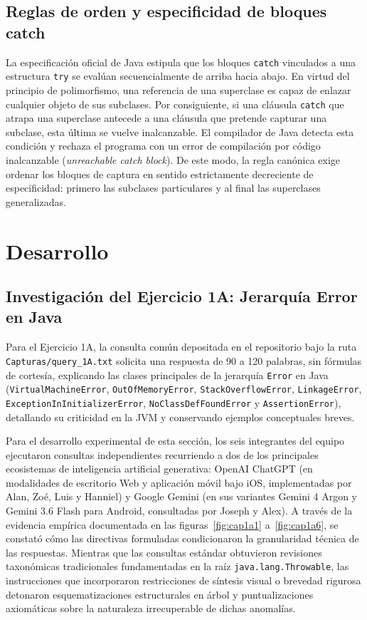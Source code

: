 \documentclass[letterpaper,12pt,oneside]{article}
\numberwithin{figure}{section}
\begin{document}
\subsection{Reglas de orden y especificidad de bloques catch}
La especificación oficial de Java \cite{gosling2023} estipula que los bloques \texttt{catch} vinculados a una estructura \texttt{try} se evalúan secuencialmente de arriba hacia abajo. En virtud del principio de polimorfismo, una referencia de una superclase es capaz de enlazar cualquier objeto de sus subclases. Por consiguiente, si una cláusula \texttt{catch} que atrapa una superclase antecede a una cláusula que pretende capturar una subclase, esta última se vuelve inalcanzable. El compilador de Java detecta esta condición y rechaza el programa con un error de compilación por código inalcanzable (\textit{unreachable catch block}). De este modo, la regla canónica exige ordenar los bloques de captura en sentido estrictamente decreciente de especificidad: primero las subclases particulares y al final las superclases generalizadas.

\section{Desarrollo}

\subsection{Investigación del Ejercicio 1A: Jerarquía Error en Java}
Para el Ejercicio 1A, la consulta común depositada en el repositorio bajo la ruta \texttt{Capturas/query\_1A.txt} solicita una respuesta de 90 a 120 palabras, sin fórmulas de cortesía, explicando las clases principales de la jerarquía \texttt{Error} en Java (\texttt{Virtual\-Machine\-Error}, \texttt{Out\-Of\-Memory\-Error}, \texttt{Stack\-Overflow\-Error}, \texttt{Linkage\-Error}, \texttt{Exception\-In\-Initializer\-Error}, \texttt{No\-Class\-Def\-Found\-Error} y \texttt{Assertion\-Error}), detallando su criticidad en la JVM y conservando ejemplos conceptuales breves.

Para el desarrollo experimental de esta sección, los seis integrantes del equipo ejecutaron consultas independientes recurriendo a dos de los principales ecosistemas de inteligencia artificial generativa: OpenAI ChatGPT (en modalidades de escritorio Web y aplicación móvil bajo iOS, implementadas por Alan, Zoé, Luis y Hanniel) y Google Gemini (en sus variantes Gemini 4 Argon y Gemini 3.6 Flash para Android, consultadas por Joseph y Alex). A través de la evidencia empírica documentada en las figuras~\ref{fig:cap1a1} a~\ref{fig:cap1a6}, se constató cómo las directivas formuladas condicionaron la granularidad técnica de las respuestas. Mientras que las consultas estándar obtuvieron revisiones taxonómicas tradicionales fundamentadas en la raíz \texttt{java.lang.Throwable}, las instrucciones que incorporaron restricciones de síntesis visual o brevedad rigurosa detonaron esquematizaciones estructurales en árbol y puntualizaciones axiomáticas sobre la naturaleza irrecuperable de dichas anomalías.
\end{document}
